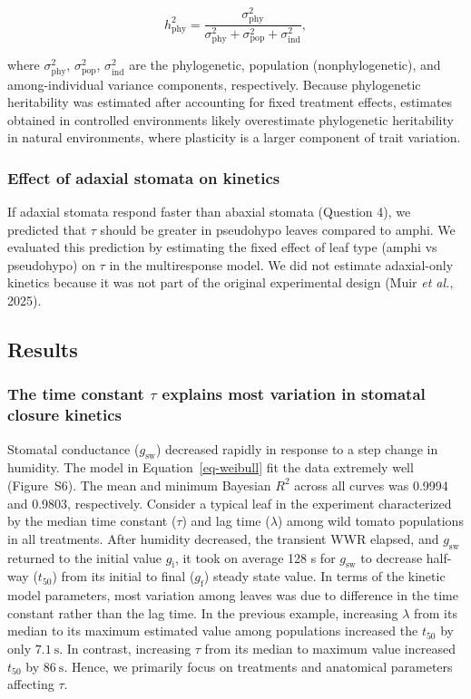 \documentclass[
  letterpaper,
  DIV=11,
  numbers=noendperiod]{scrartcl}
\newcommand{\gi}{$g_\mathrm{i}$}
\newcommand{\gf}{$g_\mathrm{f}$}
\newcommand{\gsw}{$g_\mathrm{sw}$}
\begin{document}
\[h^2_{\mathrm{phy}} = \frac{\sigma^2_\mathrm{phy}}{\sigma^2_\mathrm{phy} + \sigma^2_\mathrm{pop} + \sigma^2_\mathrm{ind}},\]

where \(\sigma^2_\mathrm{phy}\), \(\sigma^2_\mathrm{pop}\),
\(\sigma^2_\mathrm{ind}\) are the phylogenetic, population
(nonphylogenetic), and among-individual variance components,
respectively. Because phylogenetic heritability was estimated after
accounting for fixed treatment effects, estimates obtained in controlled
environments likely overestimate phylogenetic heritability in natural
environments, where plasticity is a larger component of trait variation.

\subsubsection{Effect of adaxial stomata on
kinetics}\label{effect-of-adaxial-stomata-on-kinetics}

If adaxial stomata respond faster than abaxial stomata (Question 4), we
predicted that \(\tau\) should be greater in pseudohypo leaves compared
to amphi. We evaluated this prediction by estimating the fixed effect of
leaf type (amphi vs pseudohypo) on \(\tau\) in the multiresponse model.
We did not estimate adaxial-only kinetics because it was not part of the
original experimental design (Muir \emph{et al.}, 2025).

\subsection{Results}\label{results}

\subsubsection{\texorpdfstring{The time constant \(\tau\) explains most
variation in stomatal closure
kinetics}{The time constant \textbackslash tau explains most variation in stomatal closure kinetics}}\label{the-time-constant-tau-explains-most-variation-in-stomatal-closure-kinetics}

Stomatal conductance (\gsw) decreased rapidly in response to a step
change in humidity. The model in Equation~\ref{eq-weibull} fit the data
extremely well (Figure~S6). The mean and minimum
Bayesian \(R^2\) across all curves was 0.9994 and 0.9803, respectively.
Consider a typical leaf in the experiment characterized by the median
time constant (\(\tau\)) and lag time (\(\lambda\)) among wild tomato
populations in all treatments. After humidity decreased, the transient
WWR elapsed, and \gsw{} returned to the initial value \gi, it took on
average 128 s for \gsw{} to decrease half-way (\(t_{50}\)) from its
initial to final (\gf) steady state value. In terms of the kinetic model
parameters, most variation among leaves was due to difference in the
time constant rather than the lag time. In the previous example,
increasing \(\lambda\) from its median to its maximum estimated value
among populations increased the \(t_{50}\) by only
\(\SI{7.1}{\second}\). In contrast, increasing \(\tau\) from its median
to maximum value increased \(t_{50}\) by \(\SI{86}{\second}\). Hence, we
primarily focus on treatments and anatomical parameters affecting
\(\tau\).
\end{document}

